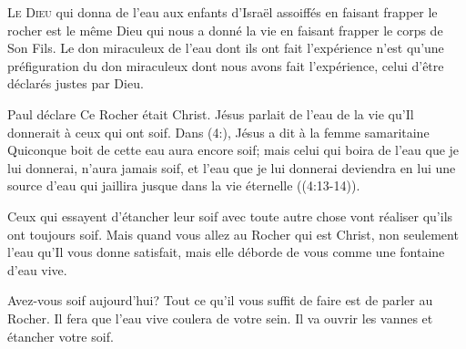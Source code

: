 \dvrule






\lettrine{L}{e Dieu} qui donna de l'eau aux enfants d'Israël
 assoiffés en faisant frapper le rocher
 est le même Dieu qui nous a donné la vie
 en faisant frapper le corps de Son Fils.
 Le don miraculeux de l'eau dont ils ont fait l'expérience
 n'est qu'une préfiguration du don miraculeux
 dont nous avons fait l'expérience,
 celui d'être déclarés justes par Dieu.


Paul déclare\frcolon{}
 \Og Ce Rocher était Christ. \Fg{}
 Jésus parlait de l'eau de la vie qu'Il donnerait
 à ceux qui ont soif. Dans (4:),
 Jésus a dit à la femme samaritaine\frcolon{}
 \Og Quiconque boit de cette eau aura encore soif;
 mais celui qui boira de l'eau que je lui donnerai,
 n'aura jamais soif, et l'eau que je lui donnerai
 deviendra en lui une source d'eau qui jaillira
 jusque dans la vie éternelle \Fg{}
 ((4:13-14)).

Ceux qui essayent d'étancher leur soif
 avec toute autre chose vont réaliser qu'ils ont toujours soif.
 Mais quand vous allez au Rocher qui est Christ,
 non seulement l'eau qu'Il vous donne satisfait,
 mais elle déborde de vous comme une fontaine d'eau vive.

Avez-vous soif aujourd'hui?
 Tout ce qu'il vous suffit de faire est de parler au Rocher.
 Il fera que l'eau vive coulera de votre sein.
 Il va ouvrir les vannes et étancher votre soif.

\dvrule



